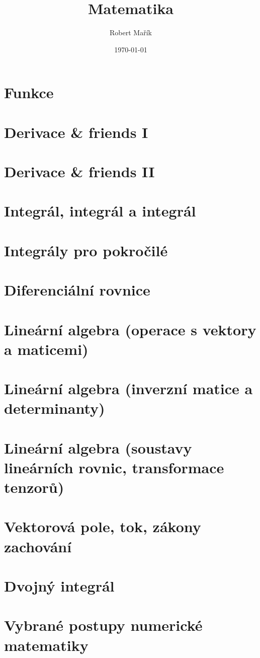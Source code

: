 \documentclass[twocolumn]{report}
\title{Matematika}
\author{Robert Mařík}
\date{\today}
\begin{document}
\maketitle


\tableofcontents

\chapter{Funkce}


\chapter{Derivace \& friends I}


\chapter{Derivace \& friends II}


\chapter{Integrál, integrál a integrál}


\chapter{Integrály pro pokročilé}


\chapter{Diferenciální rovnice}


\chapter{Lineární algebra (operace s vektory a maticemi)}


\chapter{Lineární algebra (inverzní matice a determinanty)}


\chapter{Lineární algebra (soustavy lineárních rovnic, transformace tenzorů)}


\chapter{Vektorová pole, tok, zákony zachování}


\chapter{Dvojný integrál}


\chapter{Vybrané postupy numerické matematiky}

\end{document}
